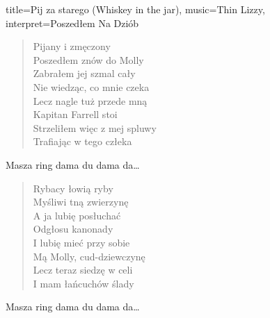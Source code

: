\begin{song}{title={Pij za starego (Whiskey in the jar)}, music={Thin Lizzy}, interpret={Poszedłem Na Dziób}}
\begin{multicols}{2}
\begin{interlude}
           
    \end{interlude}
    \begin{verse}
        Pijany i zmęczony \\
        Poszedłem znów do Molly \\
        Zabrałem jej szmal cały \\
        Nie wiedząc, co mnie czeka \\
        Lecz nagle tuż przede mną \\
        Kapitan Farrell stoi \\
        Strzeliłem więc z mej spluwy \\
        Trafiając w tego człeka
    \end{verse}
    \begin{chorus}
        Masza ring dama du dama da\ldots
    \end{chorus}
    \begin{interlude}
           
    \end{interlude}
    \begin{verse}
        Rybacy łowią ryby \\
        Myśliwi tną zwierzynę \\
        A ja lubię posłuchać \\
        Odgłosu kanonady \\
        I lubię mieć przy sobie \\
        Mą Molly, cud-dziewczynę \\
        Lecz teraz siedzę w celi \\
        I mam łańcuchów ślady
    \end{verse}
    \begin{chorus}
        Masza ring dama du dama da\ldots
    \end{chorus}
    \begin{interlude}
           
    \end{interlude}
\end{multicols}
\end{song}

